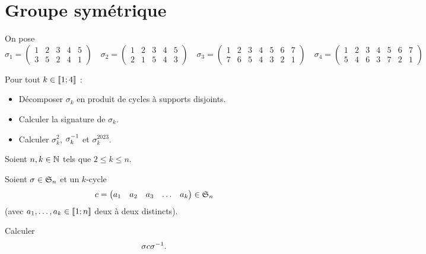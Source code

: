 \chapter{Groupe symétrique}

\minitoc

\begin{exo}
On pose \[\sigma_1=\begin{pmatrix}
1 & 2 & 3 & 4 & 5 \\
3 & 5 & 2 & 4 & 1
\end{pmatrix}\quad\sigma_2=\begin{pmatrix}
1 & 2 & 3 & 4 & 5 \\
2 & 1 & 5 & 4 & 3
\end{pmatrix}\quad\sigma_3=\begin{pmatrix}
1 & 2 & 3 & 4 & 5 & 6 & 7 \\
7 & 6 & 5 & 4 & 3 & 2 & 1
\end{pmatrix}\quad\sigma_4=\begin{pmatrix}
1 & 2 & 3 & 4 & 5 & 6 & 7 \\
5 & 4 & 6 & 3 & 7 & 2 & 1
\end{pmatrix}\]

Pour tout \(k\in\interventierii{1}{4}\) :

\begin{itemize}
\item Décomposer \(\sigma_k\) en produit de cycles à supports disjoints. \\

\item Calculer la signature de \(\sigma_k\). \\

\item Calculer \(\sigma_k^2\), \(\sigma_k\inv\) et \(\sigma_k^{2023}\).
\end{itemize}
\end{exo}

\begin{corr}
\end{corr}

\begin{exo}
Soient \(n,k\in\N\) tels que \(2\leq k\leq n\).

Soient \(\sigma\in\S{n}\) et un \(k\)-cycle \[c=\begin{pmatrix}a_1 & a_2 & a_3 & \dots & a_k\end{pmatrix}\in\S{n}\] (avec \(a_1,\dots,a_k\in\interventierii{1}{n}\) deux à deux distincts).

Calculer \[\sigma c\sigma\inv.\]
\end{exo}

